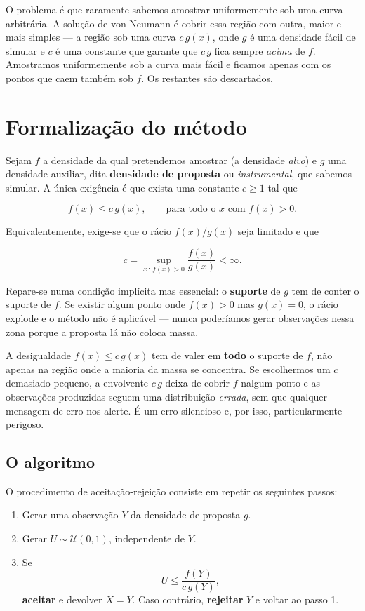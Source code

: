 \documentclass[
  portuguese,
  11pt,
  openany]{book}
\providecommand{\tightlist}{%
  \setlength{\itemsep}{0pt}\setlength{\parskip}{0pt}}
\begin{document}
O problema é que raramente sabemos amostrar uniformemente sob uma curva
arbitrária. A solução de von Neumann é cobrir essa região com outra, maior e
mais simples --- a região sob uma curva \(c\,g(x)\), onde \(g\) é uma densidade fácil
de simular e \(c\) é uma constante que garante que \(c\,g\) fica sempre \emph{acima} de
\(f\). Amostramos uniformemente sob a curva mais fácil e ficamos apenas com os
pontos que caem também sob \(f\). Os restantes são descartados.

\section{Formalização do método}\label{formalizauxe7uxe3o-do-muxe9todo}

Sejam \(f\) a densidade da qual pretendemos amostrar (a densidade \emph{alvo}) e \(g\)
uma densidade auxiliar, dita \textbf{densidade de proposta} ou \emph{instrumental}, que
sabemos simular. A única exigência é que exista uma constante \(c \geq 1\) tal que

\[
f(x) \leq c\,g(x), \qquad \text{para todo o } x \text{ com } f(x) > 0.
\]

Equivalentemente, exige-se que o rácio \(f(x)/g(x)\) seja limitado e que

\[
c = \sup_{x \,:\, f(x) > 0} \frac{f(x)}{g(x)} < \infty.
\]

Repare-se numa condição implícita mas essencial: o \textbf{suporte} de \(g\) tem de
conter o suporte de \(f\). Se existir algum ponto onde \(f(x) > 0\) mas \(g(x) = 0\),
o rácio explode e o método não é aplicável --- nunca poderíamos gerar
observações nessa zona porque a proposta lá não coloca massa.

A desigualdade \(f(x) \leq c\,g(x)\) tem de valer em \textbf{todo} o suporte de \(f\),
não apenas na região onde a maioria da massa se concentra. Se escolhermos um
\(c\) demasiado pequeno, a envolvente \(c\,g\) deixa de cobrir \(f\) nalgum ponto e as
observações produzidas seguem uma distribuição \emph{errada}, sem que qualquer
mensagem de erro nos alerte. É um erro silencioso e, por isso, particularmente
perigoso.

\subsection{O algoritmo}\label{o-algoritmo}

O procedimento de aceitação-rejeição consiste em repetir os seguintes passos:

\begin{enumerate}
\def\labelenumi{\arabic{enumi}.}
\tightlist
\item
  Gerar uma observação \(Y\) da densidade de proposta \(g\).
\item
  Gerar \(U \sim \mathcal{U}(0,1)\), independente de \(Y\).
\item
  Se
  \[
  U \leq \frac{f(Y)}{c\,g(Y)},
  \]
  \textbf{aceitar} e devolver \(X = Y\). Caso contrário, \textbf{rejeitar} \(Y\) e voltar ao
  passo 1.
\end{enumerate}
\end{document}
